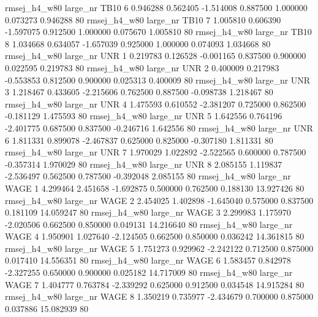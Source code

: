 rmsej_h4_w80   large_nr     TB10                 6  0.946288  0.562405  -1.514008 0.887500 1.000000  0.073273    0.946288 80
rmsej_h4_w80   large_nr     TB10                 7  1.005810  0.606390  -1.597075 0.912500 1.000000  0.075670    1.005810 80
rmsej_h4_w80   large_nr     TB10                 8  1.034668  0.634057  -1.657039 0.925000 1.000000  0.074093    1.034668 80
rmsej_h4_w80   large_nr      UNR                 1  0.219783  0.126528  -0.001165 0.837500 0.900000  0.022595    0.219783 80
rmsej_h4_w80   large_nr      UNR                 2  0.400009  0.217983  -0.553853 0.812500 0.900000  0.025313    0.400009 80
rmsej_h4_w80   large_nr      UNR                 3  1.218467  0.433605  -2.215606 0.762500 0.887500 -0.098738    1.218467 80
rmsej_h4_w80   large_nr      UNR                 4  1.475593  0.610552  -2.381207 0.725000 0.862500 -0.181129    1.475593 80
rmsej_h4_w80   large_nr      UNR                 5  1.642556  0.764196  -2.401775 0.687500 0.837500 -0.246716    1.642556 80
rmsej_h4_w80   large_nr      UNR                 6  1.811331  0.899078  -2.467837 0.625000 0.825000 -0.307180    1.811331 80
rmsej_h4_w80   large_nr      UNR                 7  1.970029  1.022892  -2.522565 0.600000 0.787500 -0.357314    1.970029 80
rmsej_h4_w80   large_nr      UNR                 8  2.085155  1.119837  -2.536497 0.562500 0.787500 -0.392048    2.085155 80
rmsej_h4_w80   large_nr     WAGE                 1  4.299464  2.451658  -1.692875 0.500000 0.762500  0.188130   13.927426 80
rmsej_h4_w80   large_nr     WAGE                 2  2.454025  1.402898  -1.645040 0.575000 0.837500  0.181109   14.059247 80
rmsej_h4_w80   large_nr     WAGE                 3  2.299983  1.175970  -2.020506 0.662500 0.850000  0.049131   14.216640 80
rmsej_h4_w80   large_nr     WAGE                 4  1.950901  1.027640  -2.124505 0.662500 0.850000  0.036242   14.361815 80
rmsej_h4_w80   large_nr     WAGE                 5  1.751273  0.929962  -2.242122 0.712500 0.875000  0.017410   14.556351 80
rmsej_h4_w80   large_nr     WAGE                 6  1.583457  0.842978  -2.327255 0.650000 0.900000  0.025182   14.717009 80
rmsej_h4_w80   large_nr     WAGE                 7  1.404777  0.763784  -2.339292 0.625000 0.912500  0.034548   14.915284 80
rmsej_h4_w80   large_nr     WAGE                 8  1.350219  0.735977  -2.434679 0.700000 0.875000  0.037886   15.082939 80